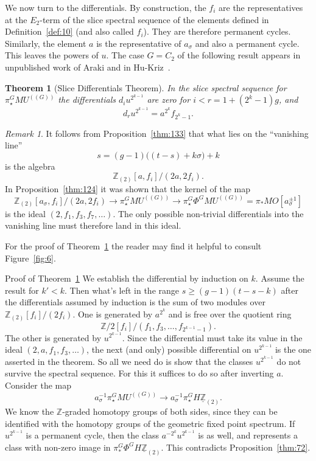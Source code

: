 \documentclass{amsart}
\newtheorem{thm}[equation]{Theorem}
\newtheorem{rem}[equation]{Remark}
\theoremstyle{definition}
\theoremstyle{remark}
\newtheorem{rem}[equation]{Remark}
\newenvironment{pf*}[1]{\bigskip{\em #1:\/}}{\qed\medskip}
\newcommand{\Z}{{\mathbb Z}}
\newcommand{\mutn}[1]{MU^{(\!(#1)\!)}}
\newcommand{\gfp}[1]{\Phi^{#1}}
\newcommand{\phig}{\gfp{G}}
\newcommand{\zltm}{\underline{\Z}_{(2)}}
\begin{document}
We now turn to the differentials.  By construction, the $f_{i}$ are
the representatives at the $E_{2}$-term of the slice spectral sequence
of the elements defined in Definition~\ref{def:10} (and also called
$f_{i}$).  They are therefore permanent cycles.  Similarly, the
element $a$ is the representative of $a_{\sigma}$ and also a permanent
cycle.  This leaves the powers of $u$.  The case $G=C_{2}$ of the
following result appears in unpublished work of Araki and in
Hu-Kriz~\cite{MR1808224}.


\begin{thm}[Slice Differentials Theorem]
\label{thm:45}
In the slice spectral sequence for $\pi^{G}_{\star}\mutn{G}$ the
differentials $d_{i}u^{2^{k-1}}$ are zero for $i<r=1+(2^{k}-1)g$, and
\[
d_{r}u^{2^{k-1}} = a^{2^{k}}f_{2^{k}-1}.
\]
\end{thm}

\begin{rem}
\label{rem:5} It follows from Proposition~\ref{thm:133} that what lies
on the ``vanishing line''
\[
s = (g-1)\big((t-s)+k\sigma\big)+k
\]
is the algebra
\[
\Z_{(2)}[a,f_{i}]/(2a, 2f_{i}).
\]
In Proposition~\ref{thm:124} it was shown that the kernel of the map
\[
\Z_{(2)}[a_{\sigma},f_{i}]/(2a, 2f_{i})\to
\pi^{G}_{\star}\mutn{G}\to \pi^{G}_{\star}\phig\mutn{G}=\pi_{\ast}MO[a_{\sigma}^{\pm1}]
\]
is the ideal $(2, f_{1}, f_{3}, f_{7},\dots)$.  The only possible
non-trivial differentials into the vanishing line must therefore land
in this ideal.
\end{rem}

For the proof of Theorem~\ref{thm:45} the reader may find it helpful
to consult Figure~\ref{fig:6}.

\begin{pf*}{Proof of Theorem~\ref{thm:45}}
We establish the differential by induction on $k$.  Assume the result
for $k'<k$.  Then what's left in the range $s\ge (g-1)(t-s-k)$ after
the differentials assumed by induction is the sum of two modules over
$\Z_{(2)}[f_{i}]/(2 f_{i})$.  One is generated by $a^{2^{k}}$ and is
free over the quotient ring
\[
\Z/2[f_{i}]/(f_{1},f_{3},\dots, f_{2^{k-1}-1}).
\]
The other is generated by $u^{2^{k-1}}$.  Since the differential must
take its value in the ideal $(2,a,f_{1},f_{3},\dots)$, the next (and
only) possible differential on $u^{2^{k-1}}$ is the one asserted in
the theorem.  So all we need do is show that the classes $u^{2^{k-1}}$
do not survive the spectral sequence.  For this it suffices to do so
after inverting $a$.  Consider the map
\[
a_{\sigma}^{-1}\pi^{G}_{\star}\mutn{G}
\to a_{\sigma}^{-1}\pi^{G}_{\star}H\zltm.
\]
We know the $\Z$-graded homotopy groups of both sides, since they can
be identified with the homotopy groups of the geometric fixed point
spectrum.  If $u^{2^{k-1}}$ is a permanent cycle, then the class
$a^{-2^{k}}u^{2^{k-1}}$ is as well, and represents a class with
non-zero image in $\pi^{G}_{\ast}\phig H\zltm$.  This contradicts
Proposition~\ref{thm:72}.
\end{pf*}
\end{document}
